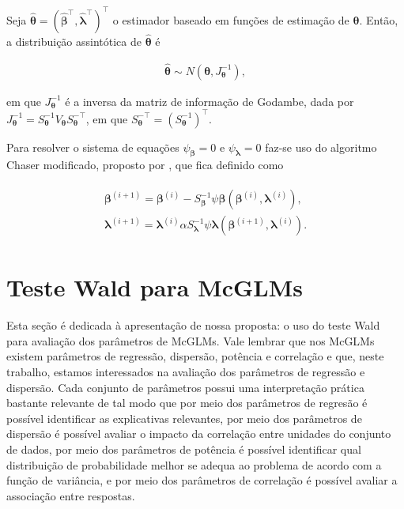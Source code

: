 \documentclass[AMA,STIX1COL]{WileyNJD-v2}
\begin{document}
Seja $\boldsymbol{\hat{\theta}} = (\boldsymbol{\hat{\beta}^{\top}}, \boldsymbol{\hat{\lambda}^{\top}})^{\top}$ o estimador baseado em funções de estimação de $\boldsymbol{\theta}$. Então, a distribuição assintótica de $\boldsymbol{\hat{\theta}}$ é

$$
  \begin{aligned}
    \boldsymbol{\hat{\theta}} \sim N(\boldsymbol{\theta}, J_{\boldsymbol{\theta}}^{-1}),
  \end{aligned}
$$

\noindent em que $J_{\boldsymbol{\theta}}^{-1}$ é a inversa da matriz de informação de Godambe, dada por $J_{\boldsymbol{\theta}}^{-1} = S_{\boldsymbol{\theta}}^{-1} V_{\boldsymbol{\theta}} S_{\boldsymbol{\theta}}^{-\top}$, em que $S_{\boldsymbol{\theta}}^{-\top} = (S_{\boldsymbol{\theta}}^{-1})^{\top}.$

Para resolver o sistema de equações $\psi_{\boldsymbol{\beta}} = 0$ e $\psi_{\boldsymbol{\lambda}} = 0$ faz-se uso do algoritmo Chaser modificado, proposto por \cite{jorg04}, que fica definido como

$$
\begin{aligned}
\begin{matrix}
\boldsymbol{\beta}^{(i+1)} = \boldsymbol{\beta}^{(i)}- S_{\boldsymbol{\beta}}^{-1} \psi \boldsymbol{\beta} (\boldsymbol{\beta}^{(i)}, \boldsymbol{\lambda}^{(i)}), \\ 
\boldsymbol{\lambda}^{(i+1)} = \boldsymbol{\lambda}^{(i)}\alpha S_{\boldsymbol{\lambda}}^{-1} \psi \boldsymbol{\lambda} (\boldsymbol{\beta}^{(i+1)}, \boldsymbol{\lambda}^{(i)}).
\end{matrix}
\end{aligned}
$$


\section{Teste Wald para McGLMs}\label{sec4}

Esta seção é dedicada à apresentação de nossa proposta: o uso do teste Wald para avaliação dos parâmetros de McGLMs. Vale lembrar que nos McGLMs existem parâmetros de regressão, dispersão, potência e correlação e que, neste trabalho, estamos interessados na avaliação dos parâmetros de regressão e dispersão. Cada conjunto de parâmetros possui uma interpretação prática bastante relevante de tal modo que por meio dos parâmetros de regresão é possível identificar as explicativas relevantes, por meio dos parâmetros de dispersão é possível avaliar o impacto da correlação entre unidades do conjunto de dados, por meio dos parâmetros de potência é possível identificar qual distribuição de probabilidade melhor se adequa ao problema de acordo com a função de variância, e por meio dos parâmetros de correlação é possível avaliar a associação entre respostas.
\end{document}
